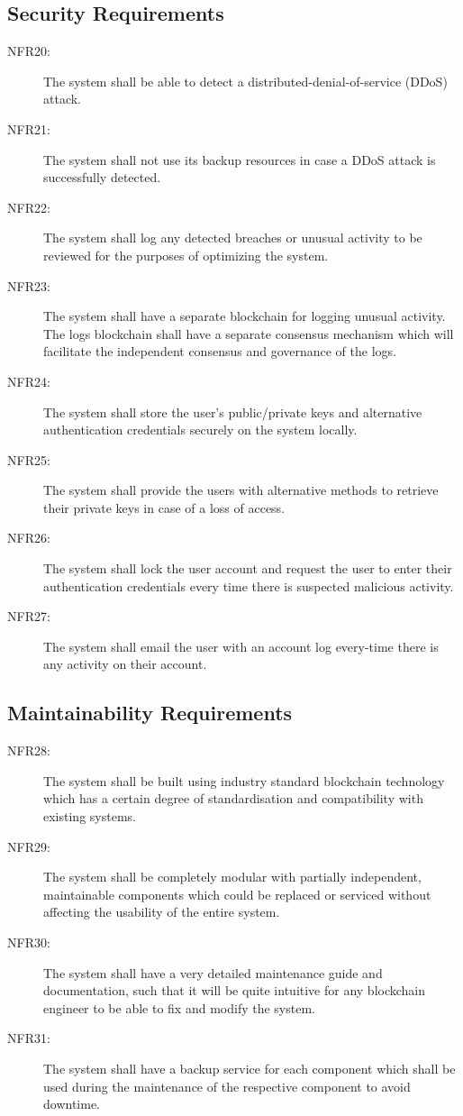 \documentclass[a4paper,twoside,phd]{BYUPhys}
\begin{document}
\subsection{Security Requirements}
\begin{description}
\item[NFR20:] The system shall be able to detect a distributed-denial-of-service (DDoS) attack.
\item[NFR21:] The system shall not use its backup resources in case a DDoS attack is successfully detected.
\item[NFR22:] The system shall log any detected breaches or unusual activity to be reviewed for the purposes of optimizing the system.
\item[NFR23:] The system shall have a separate blockchain for logging unusual activity. The logs blockchain shall have a separate consensus mechanism which will facilitate the independent consensus and governance of the logs.
\item[NFR24:] The system shall store the user's public/private keys and alternative authentication credentials securely on the system locally.
\item[NFR25:] The system shall provide the users with alternative methods to retrieve their private keys in case of a loss of access.
\item[NFR26:] The system shall lock the user account and request the user to enter their authentication credentials every time there is suspected malicious activity.
\item[NFR27:] The system shall email the user with an account log every-time there is any activity on their account.
\end{description}
\subsection{Maintainability Requirements}
\begin{description}
\item[NFR28:] The system shall be built using industry standard blockchain technology which has a certain degree of standardisation and compatibility with existing systems.
\item[NFR29:] The system shall be completely modular with partially independent, maintainable components which could be replaced or serviced without affecting the usability of the entire system.
\item[NFR30:] The system shall have a very detailed maintenance guide and documentation, such that it will be quite intuitive for any blockchain engineer to be able to fix and modify the system.
\item[NFR31:] The system shall have a backup service for each component which shall be used during the maintenance of the respective component to avoid downtime. 
\end{description}
\end{document}
